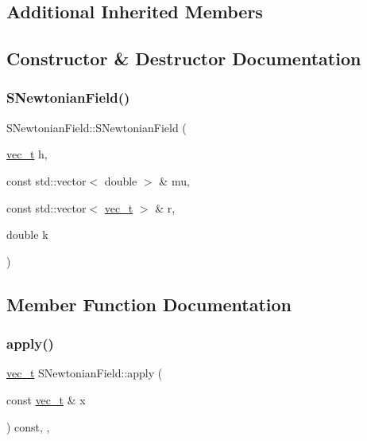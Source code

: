 \subsection*{Additional Inherited Members}


\subsection{Constructor \& Destructor Documentation}
\mbox{\label{class_s_newtonian_field_a3e0816f9bbfd74f70b881562a0d590b5}} 
\subsubsection{\texorpdfstring{SNewtonianField()}{SNewtonianField()}}
{\footnotesize\ttfamily S\+Newtonian\+Field\+::\+S\+Newtonian\+Field (\begin{DoxyParamCaption}\item[{\mbox{\hyperlink{group___n_algebra_ga0a2cfc67e738a3d73e4f12098c4c07f6}{vec\+\_\+t}}}]{h,  }\item[{const std\+::vector$<$ double $>$ \&}]{mu,  }\item[{const std\+::vector$<$ \mbox{\hyperlink{group___n_algebra_ga0a2cfc67e738a3d73e4f12098c4c07f6}{vec\+\_\+t}} $>$ \&}]{r,  }\item[{double}]{k }\end{DoxyParamCaption})}



\subsection{Member Function Documentation}
\mbox{\label{class_s_newtonian_field_a1f42f77de6b77085a6a5f018fe44d41e}} 
\subsubsection{\texorpdfstring{apply()}{apply()}}
{\footnotesize\ttfamily \mbox{\hyperlink{group___n_algebra_ga0a2cfc67e738a3d73e4f12098c4c07f6}{vec\+\_\+t}} S\+Newtonian\+Field\+::apply (\begin{DoxyParamCaption}\item[{const \mbox{\hyperlink{group___n_algebra_ga0a2cfc67e738a3d73e4f12098c4c07f6}{vec\+\_\+t}} \&}]{x }\end{DoxyParamCaption}) const\hspace{0.3cm}{\ttfamily [override]}, {\ttfamily [protected]}, {\ttfamily [virtual]}}



